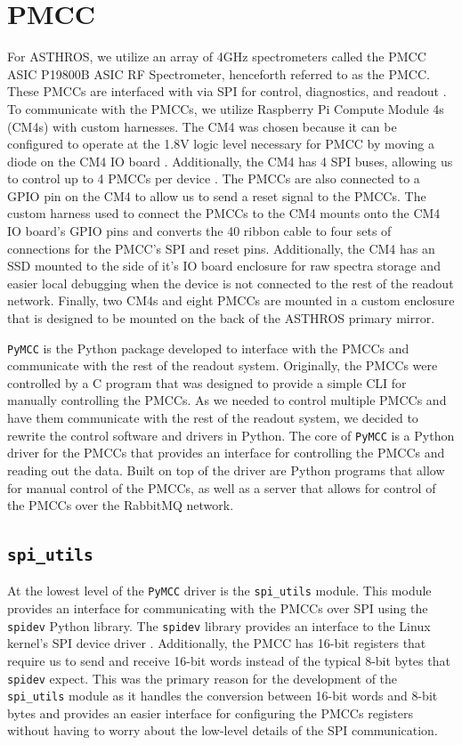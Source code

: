 \section{PMCC}
For ASTHROS, we utilize an array of 4GHz spectrometers called the PMCC ASIC P19800B ASIC RF Spectrometer, henceforth referred to as the PMCC.
These PMCCs are interfaced with via SPI for control, diagnostics, and readout \parencite{PMCCP19800B}.
To communicate with the PMCCs, we utilize Raspberry Pi Compute Module 4s (CM4s) with custom harnesses.
The CM4 was chosen because it can be configured to operate at the 1.8V logic level necessary for PMCC by moving a diode on the CM4 IO board \parencite{cm4io}.
Additionally, the CM4 has 4 SPI buses, allowing us to control up to 4 PMCCs per device \parencite{cm4}.
The PMCCs are also connected to a GPIO pin on the CM4 to allow us to send a reset signal to the PMCCs.
The custom harness used to connect the PMCCs to the CM4 mounts onto the CM4 IO board's GPIO pins and converts the 40 ribbon cable to four sets of connections for the PMCC's SPI and reset pins.
Additionally, the CM4 has an SSD mounted to the side of it's IO board enclosure for raw spectra storage and easier local debugging when the device is not connected to the rest of the readout network.
Finally, two CM4s and eight PMCCs are mounted in a custom enclosure that is designed to be mounted on the back of the ASTHROS primary mirror.

\texttt{PyMCC} is the Python package developed to interface with the PMCCs and communicate with the rest of the readout system.
Originally, the PMCCs were controlled by a C program that was designed to provide a simple CLI for manually controlling the PMCCs.
As we needed to control multiple PMCCs and have them communicate with the rest of the readout system, we decided to rewrite the control software and drivers in Python.
The core of \texttt{PyMCC} is a Python driver for the PMCCs that provides an interface for controlling the PMCCs and reading out the data.
Built on top of the driver are Python programs that allow for manual control of the PMCCs, as well as a server that allows for control of the PMCCs over the RabbitMQ network.

\subsection{\texttt{spi\_utils}}
At the lowest level of the \texttt{PyMCC} driver is the \texttt{spi\_utils} module.
This module provides an interface for communicating with the PMCCs over SPI using the \texttt{spidev} Python library.
The \texttt{spidev} library provides an interface to the Linux kernel's SPI device driver \parencite{spidev}.
Additionally, the PMCC has 16-bit registers that require us to send and receive 16-bit words instead of the typical 8-bit bytes that \texttt{spidev} expect. 
This was the primary reason for the development of the \texttt{spi\_utils} module as it handles the conversion between 16-bit words and 8-bit bytes and provides an easier interface for configuring the PMCCs registers without having to worry about the low-level details of the SPI communication.

